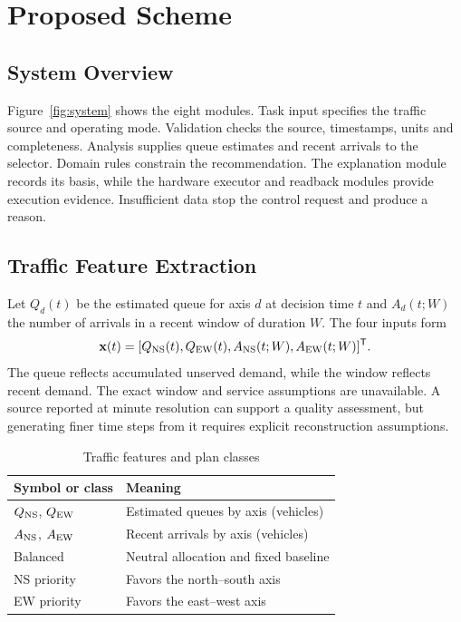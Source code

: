 \section{Proposed Scheme}
\subsection{System Overview}
Figure~\ref{fig:system} shows the eight modules. Task input specifies the traffic source and operating mode. Validation checks the source, timestamps, units and completeness. Analysis supplies queue estimates and recent arrivals to the selector. Domain rules constrain the recommendation. The explanation module records its basis, while the hardware executor and readback modules provide execution evidence. Insufficient data stop the control request and produce a reason.



\subsection{Traffic Feature Extraction}
Let $Q_d(t)$ be the estimated queue for axis $d$ at decision time $t$ and $A_d(t;W)$ the number of arrivals in a recent window of duration $W$. The four inputs form
\begin{equation}
\mathbf{x}(t)=[Q_{\rm NS}(t),Q_{\rm EW}(t),
 A_{\rm NS}(t;W),A_{\rm EW}(t;W)]^\mathsf{T}.
\label{eq:features}
\end{equation}
The queue reflects accumulated unserved demand, while the window reflects recent demand. The exact window and service assumptions are unavailable. A source reported at minute resolution can support a quality assessment, but generating finer time steps from it requires explicit reconstruction assumptions.

\begin{table}[t]
\caption{Traffic features and plan classes}
\label{tab:features}\centering\footnotesize
\begin{tabular}{@{}p{}p{}@{}}
\toprule Symbol or class & Meaning\\ \midrule
$Q_{\rm NS}$, $Q_{\rm EW}$ & Estimated queues by axis (vehicles)\\
$A_{\rm NS}$, $A_{\rm EW}$ & Recent arrivals by axis (vehicles)\\
Balanced & Neutral allocation and fixed baseline\\
NS priority & Favors the north--south axis\\
EW priority & Favors the east--west axis\\
\bottomrule
\end{tabular}
\end{table}

